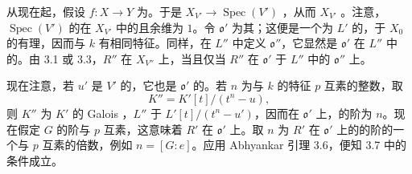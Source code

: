 从现在起，假设 $f:X\to Y$ 为。于是 $X_{V'}\to\operatorname{Spec}(V')$ ，从而 $X_{V'}$ 。注意，$\operatorname{Spec}(V')$ 的在 $X_{V'}$ 中的且余维为 $1$。令 $\mathfrak o'$ 为其；这便是一个为 $L'$ 的，于 $X_0$ 的有理，因而与 $k$ 有相同特征。同样，在 $L''$ 中定义 $\mathfrak o''$，它显然是 $\mathfrak o'$ 在 $L''$ 中的。由 3.1 或 3.3，$R''$ 在 $X_{V''}$ 上，当且仅当 $R''$ 在 $\mathfrak o'$ 于 $L''$ 中的 $\mathfrak o''$ 上。

现在注意，若 $u'$ 是 $V'$ 的，它也是 $\mathfrak o'$ 的。若 $n$ 为与 $k$ 的特征 $p$ 互素的整数，取
\[
K''=K'[t]/(t^n-u),
\]
则 $K''$ 为 $K'$ 的 Galois ，$L''$ 于 $L'[t]/(t^n-u')$，因而在 $\mathfrak o'$ 上，的阶为 $n$。现在假定 $G$ 的阶与 $p$ 互素，这意味着 $R'$ 在 $\mathfrak o'$ 上。取 $n$ 为 $R'$ 在 $\mathfrak o'$ 上的的阶的一个与 $p$ 互素的倍数，例如 $n=[G:e]$。应用 Abhyankar 引理 3.6，便知 3.7 中的条件成立。

